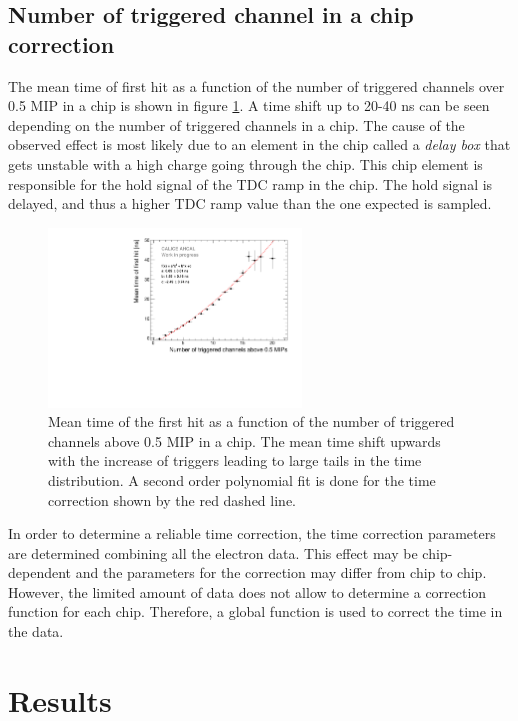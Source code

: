 \subsection{Number of triggered channel in a chip correction}

The mean time of first hit as a function of the number of triggered channels over 0.5 MIP in a chip is shown in figure \ref{fig:nhits_profile}. A time shift up to 20-40 ns can be seen depending on the number of triggered channels in a chip. The cause of the observed effect is most likely due to an element in the chip called a \textit{delay box} that gets unstable with a high charge going through the chip. This chip element is responsible for the hold signal of the TDC ramp in the chip. The hold signal is delayed, and thus a higher TDC ramp value than the one expected is sampled.

\begin{figure}[htbp!]
	\centering
	\includegraphics[width=0.6\textwidth]{fig/NumberHits_Dependance_AllEnergies.pdf}
	\caption{Mean time of the first hit as a function of the number of triggered channels above 0.5 MIP in a chip. The mean time shift upwards with the increase of triggers leading to large tails in the time distribution. A second order polynomial fit is done for the time correction shown by the red dashed line.}\label{fig:nhits_profile}
\end{figure}

In order to determine a reliable time correction, the time correction parameters are determined combining all the electron data. This effect may be chip-dependent and the parameters for the correction may differ from chip to chip. However, the limited amount of data does not allow to determine a correction function for each chip. Therefore, a global function is used to correct the time in the data.

\section{Results}

